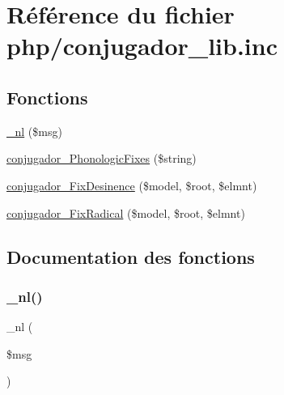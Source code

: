 \hypertarget{php_2conjugador__lib_8inc}{}\section{Référence du fichier php/conjugador\+\_\+lib.inc}
\label{php_2conjugador__lib_8inc}
\subsection*{Fonctions}
\begin{DoxyCompactItemize}
\item 
\hyperlink{php_2conjugador__lib_8inc_af8d770de4c75689bba7f9764be4d6c80}{\+\_\+nl} (\$msg)
\item 
\hyperlink{php_2conjugador__lib_8inc_a672ae0386cba05339c0708b743535c7a}{conjugador\+\_\+\+Phonologic\+Fixes} (\$string)
\item 
\hyperlink{php_2conjugador__lib_8inc_a725ad05277ee35d68a3eb88b9b577ded}{conjugador\+\_\+\+Fix\+Desinence} (\$model, \$root, \$elmnt)
\item 
\hyperlink{php_2conjugador__lib_8inc_a76b9b56f90098bda21fa8043ae7318ae}{conjugador\+\_\+\+Fix\+Radical} (\$model, \$root, \$elmnt)
\end{DoxyCompactItemize}


\subsection{Documentation des fonctions}
\hypertarget{php_2conjugador__lib_8inc_af8d770de4c75689bba7f9764be4d6c80}{}\label{php_2conjugador__lib_8inc_af8d770de4c75689bba7f9764be4d6c80} 
\subsubsection{\texorpdfstring{\+\_\+nl()}{\_nl()}}
{\footnotesize\ttfamily \+\_\+nl (\begin{DoxyParamCaption}\item[{}]{\$msg }\end{DoxyParamCaption})}

\hypertarget{php_2conjugador__lib_8inc_a725ad05277ee35d68a3eb88b9b577ded}{}\label{php_2conjugador__lib_8inc_a725ad05277ee35d68a3eb88b9b577ded} 
